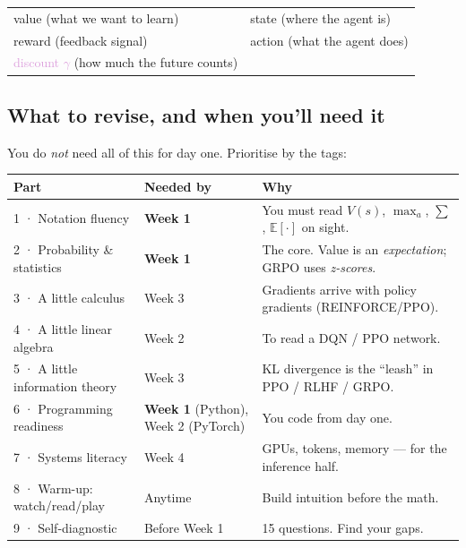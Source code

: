 \documentclass[11pt]{article}
\newcommand{\vval}[1]{\textcolor{forest}{#1}}
\newcommand{\vrew}[1]{\textcolor{ochre}{#1}}
\newcommand{\vsta}[1]{\textcolor{slate}{#1}}
\newcommand{\vact}[1]{\textcolor{accred}{#1}}
\newcommand{\vgam}[1]{\textcolor{plum}{#1}}
\begin{document}
\begin{center}
\begin{tabular}{ll}
\vval{value} (what we want to learn) & \vsta{state} (where the agent is) \\
\vrew{reward} (feedback signal) & \vact{action} (what the agent does) \\
\vgam{discount $\gamma$} (how much the future counts) & \\
\end{tabular}
\end{center}

\subsection*{What to revise, and when you'll need it}
You do \emph{not} need all of this for day one. Prioritise by the tags:

\begin{center}\small
\begin{tabularx}{\textwidth}{@{}l l X@{}}
\toprule
\sffamily Part & \sffamily Needed by & \sffamily Why \\
\midrule
1 · Notation fluency        & \textbf{Week 1} & You must read $V(s)$, $\max_a$, $\sum$, $\mathbb{E}[\cdot]$ on sight. \\
2 · Probability \& statistics & \textbf{Week 1} & The core. Value is an \emph{expectation}; GRPO uses \emph{z-scores}. \\
3 · A little calculus       & Week 3 & Gradients arrive with policy gradients (REINFORCE/PPO). \\
4 · A little linear algebra & Week 2 & To read a DQN / PPO network. \\
5 · A little information theory & Week 3 & KL divergence is the ``leash'' in PPO / RLHF / GRPO. \\
6 · Programming readiness    & \textbf{Week 1} (Python), Week 2 (PyTorch) & You code from day one. \\
7 · Systems literacy         & Week 4 & GPUs, tokens, memory — for the inference half. \\
8 · Warm-up: watch/read/play & Anytime & Build intuition before the math. \\
9 · Self-diagnostic          & Before Week 1 & 15 questions. Find your gaps. \\
\bottomrule
\end{tabularx}
\end{center}

\tableofcontents
\newpage
\end{document}
